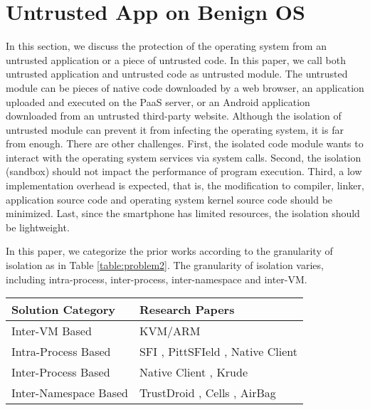 \section{Untrusted App on Benign OS}
\label{sec:problem2}

In this section, we discuss the protection of the operating system from an
untrusted application or a piece of untrusted code. In this paper, we call both
untrusted application and untrusted code as untrusted module. The untrusted
module can be pieces of native code downloaded by a web browser, an application
uploaded and executed on the PaaS server, or an Android application downloaded
from an untrusted third-party website. Although the isolation of untrusted module can
prevent it from infecting the operating system, it is far from enough. There are
other challenges. First, the isolated code module wants to interact with the
operating system services via system calls. Second, the isolation (sandbox)
should not impact the performance of program execution. Third, a low
implementation overhead is expected, that is, the modification to compiler,
linker, application source code and operating system kernel source code should
be minimized. Last, since the smartphone has limited resources, the isolation
should be lightweight. 

In this paper, we categorize the prior works according to the granularity of
isolation as in Table \ref{table:problem2}. The granularity of isolation varies,
including intra-process, inter-process, inter-namespace and inter-VM. 

\begin{table*}[ht]
	\centering
	\begin{tabular}{|l|l|}
		\hline
		\textbf{Solution Category}      & \textbf{Research Papers} \\ \hline
		Inter-VM Based         & KVM/ARM \cite{KVM/ARM} \\ \hline
		Intra-Process Based    & SFI \cite{SFI}, PittSFIeld \cite{PittSFIeld}, Native Client \cite{NaCl} \\ \hline
		Inter-Process Based    & Native Client \cite{NaCl}, Krude \etal \cite{Krude} \\ \hline
		Inter-Namespace Based  & TrustDroid \cite{TrustDroid}, Cells \cite{Cells}, AirBag \cite{AirBag} \\ \hline	
	\end{tabular}
	\caption{Solution categorization on the protection of OS from the untrusted
	application.}
	\label{table:problem2}
\end{table*}

